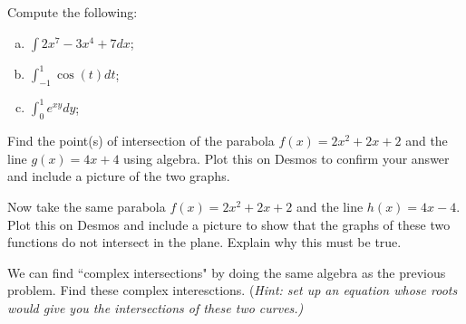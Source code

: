 \documentclass[12pt]{article} %
\begin{document}
\begin{problem}
    Compute the following:
\begin{enumerate}[(a)]
    \item $\displaystyle{\int 2x^7-3x^4+7dx}$;
    \item $\displaystyle{\int_{-1}^1 \cos(t) dt}$;
    \item $\displaystyle{\int_0^1 e^{xy}dy}$;
\end{enumerate}
\end{problem}

\begin{problem}
    Find the point(s) of intersection of the parabola $f(x)=2x^2+2x+2$ and the line $g(x)=4x+4$ using algebra. Plot this on Desmos to confirm your answer and include a picture of the two graphs.
\end{problem}

\begin{problem}
    Now take the same parabola $f(x)=2x^2+2x+2$ and the line $h(x)=4x-4$. Plot this on Desmos and include a picture to show that the graphs of these two functions do not intersect in the plane. Explain why this must be true.
    
    We can find ``complex intersections" by doing the same algebra as the previous problem. Find these complex interesctions. (\emph{Hint: set up an equation whose roots would give you the intersections of these two curves.)}
\end{problem}
\end{document}
